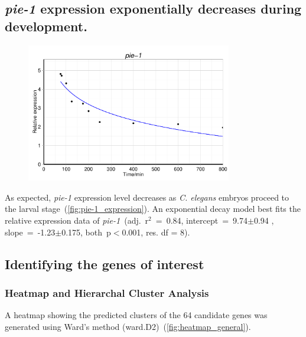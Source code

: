 \documentclass[11pt]{article}
\begin{document}

\subsection{\textit{pie-1} expression exponentially decreases during development.}

\begin{figure}[H]
  \centering
    \includegraphics[width=0.8\textwidth]{pie-1_expression.pdf}
  \label{fig:pie-1_expression}
\end{figure}

As expected, \textit{pie-1} expression level decreases as \textit{C. elegans} embryos proceed to the larval stage~(\autoref{fig:pie-1_expression}). An exponential decay model best fits the relative expression data of \textit{pie-1}~(adj.~r$^2$~=~0.84, intercept~=~9.74$\pm$0.94 , slope~=~-1.23$\pm$0.175, both~p$<$0.001, res. df = 8).

\subsection{Identifying the genes of interest}
\subsubsection{Heatmap and Hierarchal Cluster Analysis}
A heatmap showing the predicted clusters of the 64 candidate genes was generated using Ward's method (ward.D2)~(\autoref{fig:heatmap_general}). 
\end{document}
